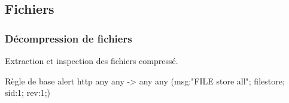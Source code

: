 \documentclass{beamer}
\begin{document}
\subsection{Fichiers}
\begin{frame}
\frametitle{Décompression de fichiers}
Extraction et inspection des fichiers compressé.
\begin{block}{Règle de base}
alert http any any -> any any (msg:"FILE store all"; filestore; sid:1; rev:1;)
\end{block}
\end{frame}
\end{document}
